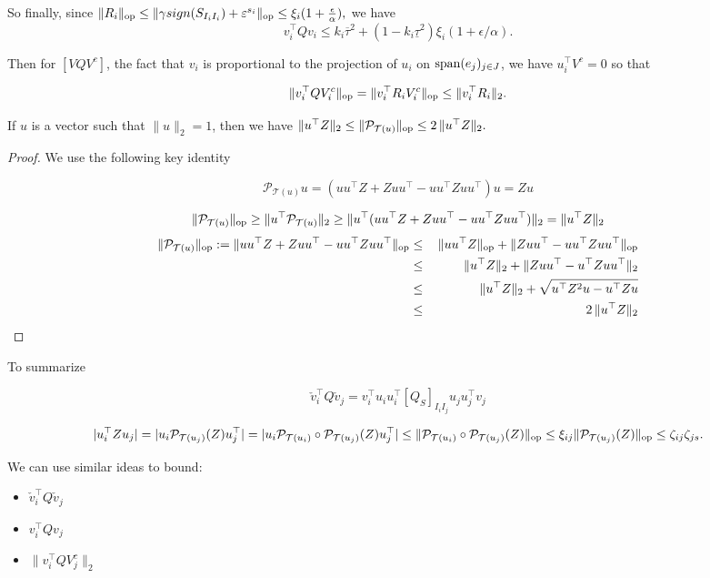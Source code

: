 \documentclass{article}
\begin{document}
So finally, since $\|R_i\|_{{\rm op}} \leq \|\gamma sign(S_{I_iI_i})+\varepsilon^{s_i}\|_{{\rm op}} \leq \xi_i (1+\frac{\epsilon}{\alpha}),$ we have 
$$v_i^\top Q v_i \leq k_i \overline{\tau}^2+(1-k_i\underline{\tau}^2) \xi_i (1+\epsilon/\alpha).$$
 
 
Then for $[V Q V^c]$, the fact that $v_i$ is proportional to the projection of $u_i$ on ${\rm span}(e_j)_{j \in J}$, we have $u_i^\top V^c=0$ so that

$$\|v_i^\top Q V_i^c\|_{{\rm op}}=\|v_i^\top R_i V_i^c\|_{{\rm op}} \leq \|v_i^\top R_i\|_{2}.$$
 
\begin{lemma}
If $u$ is a vector such that $\|u\|_2=1$, then we have
 $\|u^\top Z\|_{2} \leq \|\mathcal{P}_{\mathcal{T}(u)}\|_{{\rm op}}  \leq 2\, \|u^\top Z\|_{2}.$
\end{lemma}
\begin{proof}
We use the following key identity
 
 $$\mathcal{P}_{\mathcal{T}(u)} u=(uu^\top Z + Z uu^\top - u u^\top Z u u^\top) u =Zu$$

$$\|\mathcal{P}_{\mathcal{T}(u)}\|_{{\rm op}} \geq \|u^\top \mathcal{P}_{\mathcal{T}(u)}\|_{2} \geq \|u^\top (uu^\top Z + Z uu^\top - u u^\top Z u u^\top) \|_{2}=\|u^\top Z\|_{2}
$$
\begin{eqnarray*}
\|\mathcal{P}_{\mathcal{T}(u)}\|_{{\rm op}}:=\|uu^\top Z + Z uu^\top - u u^\top Z u u^\top\|_{{\rm op}}  
& \leq & \, \|uu^\top Z\|_{{\rm op}} + \|Z uu^\top - u u^\top Z u u^\top\|_{{\rm op}}\\
& \leq &  \, \|u^\top Z\|_{2} + \|Z uu^\top - u^\top Z u u^\top\|_{2}\\
& \leq &  \,\|u^\top Z\|_{2} + \sqrt{u^\top Z^2 u - u^\top Z u }\\
& \leq & 2 \, \|u^\top Z\|_{2}
\end{eqnarray*}
\end{proof}

To summarize

$$\check{v}_i^\top Q \check{v}_j=v_i^\top u_i u_i^\top [Q_{S}]_{I_i I_j} u_j u_j^\top v_j$$


$$|u_i^\top Z u_j| = |u_i \mathcal{P}_{\mathcal{T}(u_j)}(Z) u_j^\top|=|u_i \mathcal{P}_{\mathcal{T}(u_i)} \circ \mathcal{P}_{\mathcal{T}(u_j)}(Z) u_j^\top| \leq \|\mathcal{P}_{\mathcal{T}(u_i)} \circ \mathcal{P}_{\mathcal{T}(u_j)}(Z)\|_{{\rm op}} \leq \xi_{ij} \|\mathcal{P}_{\mathcal{T}(u_j)}(Z)\|_{{\rm op}} \leq \zeta_{ij} \zeta_{js}.$$

We can use similar ideas to bound:
\begin{itemize}
\item $\check{v}_i^\top Q \check{v}_j$ 
\item $v_i^\top Q v_j$
\item $\|v_i^\top Q V_j^c\|_2$
\end{itemize}
\end{document}
